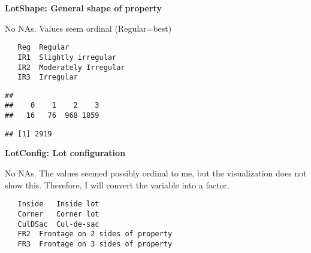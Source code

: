 \documentclass[]{article}
\newenvironment{Shaded}{\begin{snugshade}}{\end{snugshade}}
\newcommand{\DecValTok}[1]{\textcolor[rgb]{0.00,0.00,0.81}{#1}}
\newcommand{\KeywordTok}[1]{\textcolor[rgb]{0.13,0.29,0.53}{\textbf{#1}}}
\newcommand{\NormalTok}[1]{#1}
\newcommand{\OperatorTok}[1]{\textcolor[rgb]{0.81,0.36,0.00}{\textbf{#1}}}
\newcommand{\StringTok}[1]{\textcolor[rgb]{0.31,0.60,0.02}{#1}}
\begin{document}
\textbf{LotShape: General shape of property}

No NAs. Values seem ordinal (Regular=best)

\begin{verbatim}
   Reg  Regular 
   IR1  Slightly irregular
   IR2  Moderately Irregular
   IR3  Irregular
\end{verbatim}

\begin{Shaded}
\end{Shaded}

\begin{verbatim}
## 
##    0    1    2    3 
##   16   76  968 1859
\end{verbatim}

\begin{Shaded}
\end{Shaded}

\begin{verbatim}
## [1] 2919
\end{verbatim}

\textbf{LotConfig: Lot configuration}

No NAs. The values seemed possibly ordinal to me, but the visualization
does not show this. Therefore, I will convert the variable into a
factor.

\begin{verbatim}
   Inside   Inside lot
   Corner   Corner lot
   CulDSac  Cul-de-sac
   FR2  Frontage on 2 sides of property
   FR3  Frontage on 3 sides of property
   
\end{verbatim}
\end{document}
